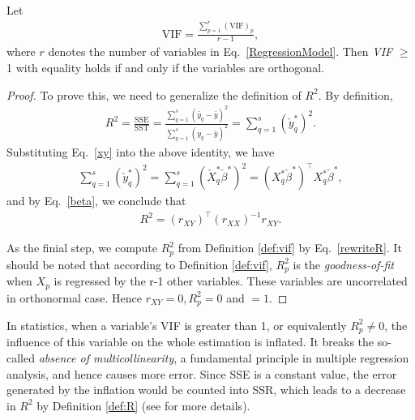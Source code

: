 \begin{theorem}\label{Thm:VIF}
	Let
	\begin{align}
		\text{VIF} = \frac{\sum_{p=1}^{r}(\text{VIF})_p}{r-1},
	\end{align}
	where $r$ denotes the number of variables in Eq.~\eqref{RegressionModel}. Then \emph{VIF} $\geq$ 1 with equality holds if and only if the variables are orthogonal.
\end{theorem}
\begin{proof}
	To prove this, we need to generalize the definition of $R^2$. By definition,
	\begin{align}
		R^2 = \frac{\text{SSE}}{\text{SST}} = \frac{\sum_{q=1}^s (\check{y_q} - \bar{y})^2}{\sum_{q=1}^s (y_q - \bar{y})^2}=\sum_{q=1}^s(\check{y}_q^*)^2.
	\end{align}
	Substituting Eq.~\eqref{xy} into the above identity, we have
	\begin{align}
		\sum_{q=1}^s(\check{y}_q^*)^2=\sum_{q=1}^s(\check{X}_{q}^* \check{\beta}^*)^2=(X_{q}^* \check{\beta}^*)^{\top}X_{q}^* \check{\beta}^*,
	\end{align}
	and by Eq.~\eqref{beta}, we conclude that
	\begin{align}\label{rewriteR}
		R^2 = (r_{XY})^{\top}(r_{XX})^{-1}r_{XY}.
	\end{align}
    
    As the finial step, we compute $R_p^2$ from Definition \ref{def:vif} by Eq.~\eqref{rewriteR}. It should be noted that according to Definition \ref{def:vif}, $R_p^2$ is the \emph{goodness-of-fit} when $X_p$ is regressed by the r-1 other variables. These variables are uncorrelated in orthonormal case. Hence $r_{XY} = 0, R_p^2 = 0$ and  $= 1$.
\end{proof}

\begin{remark}
	In statistics, when a variable's VIF is greater than 1, or equivalently $R_p^2 \neq 0$, the influence of this variable on the whole estimation is inflated. It breaks the so-called \emph{absence of multicollinearity}, a fundamental principle in multiple regression analysis, and hence causes more error. Since SSE is a constant value, the error generated by the inflation would be counted into SSR, which leads to a decrease in $R^2$ by Definition \ref{def:R} (see \cite{Kutner1985, Seber1989} for more details). 
\end{remark}


